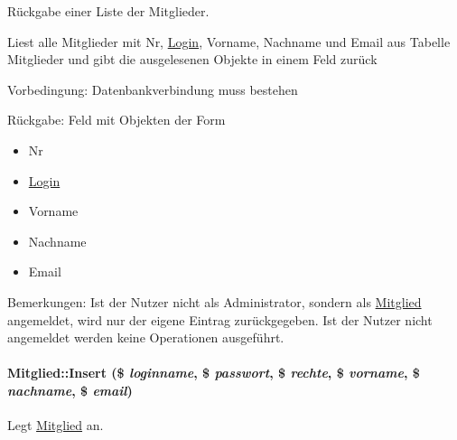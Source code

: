 Rückgabe einer Liste der Mitglieder. 

Liest alle Mitglieder mit Nr, \hyperlink{classLogin}{Login}, Vorname, Nachname und Email aus Tabelle Mitglieder und gibt die ausgelesenen Objekte in einem Feld zurück \begin{Desc}
\item[Vorbedingung:]Datenbankverbindung muss bestehen \end{Desc}
\begin{Desc}
\item[R\"{u}ckgabe:]Feld mit Objekten der Form\begin{itemize}
\item Nr\item \hyperlink{classLogin}{Login}\item Vorname\item Nachname\item Email \end{itemize}
\end{Desc}
\begin{Desc}
\item[Bemerkungen:]Ist der Nutzer nicht als Administrator, sondern als \hyperlink{classMitglied}{Mitglied} angemeldet, wird nur der eigene Eintrag zurückgegeben. Ist der Nutzer nicht angemeldet werden keine Operationen ausgeführt. \end{Desc}
\hypertarget{classMitglied_5d9d5d087779303f002cbbcfcf1735c1}{
\paragraph[Insert]{\setlength{\rightskip}{0pt plus 5cm}Mitglied::Insert (\$ {\em loginname}, \$ {\em passwort}, \$ {\em rechte}, \$ {\em vorname}, \$ {\em nachname}, \$ {\em email})}\hfill}
\label{classMitglied_5d9d5d087779303f002cbbcfcf1735c1}


Legt \hyperlink{classMitglied}{Mitglied} an. 

